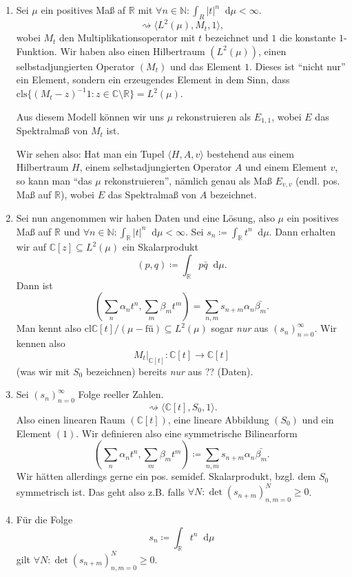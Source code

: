 \documentclass[letterpaper, 11pt]{article}
\newcommand{\R}{\mathbb{R}}
\newcommand{\C}{\mathbb{C}}
\newcommand{\N}{\mathbb{N}}
\newcommand{\1}{\mathds{1}}
\newcommand{\dd}{\mathop{}\!\mathrm{d}}
\theoremstyle{definition}
\begin{document}
\begin{enumerate}
  \item Sei $\mu$ ein positives Maß af $\R$ mit $\forall n \in \N : \int_R \vert t \vert^n \dd \mu < \infty$.
  $$ \rightsquigarrow \langle L^2(\mu), M_t, 1 \rangle, $$
  wobei $M_t$ den Multiplikationsoperator mit $t$ bezeichnet und $1$ die konstante $1$-Funktion. Wir haben also einen Hilbertraum $(L^2(\mu))$, einen selbstadjungierten Operator $(M_t)$ und das Element $1$. Dieses ist ``nicht nur'' ein Element, sondern ein erzeugendes Element in dem Sinn, dass $\mathrm{cls} \{ (M_t - z)^{-1}1 : z \in \C \setminus \R \} = L^2(\mu)$.

  Aus diesem Modell können wir uns $\mu$ rekonstruieren als $E_{1,1}$, wobei $E$ das Spektralmaß von $M_t$ ist.

  Wir sehen also: Hat man ein Tupel $\langle H, A, v \rangle$ bestehend aus einem Hilbertraum $H$, einem selbstadjungierten Operator $A$ und einem Element $v$, so kann man ``das $\mu$ rekonstruieren'', nämlich genau als Maß $E_{v,v}$ (endl. pos. Maß auf $\R$), wobei $E$ das Spektralmaß von $A$ bezeichnet.

  \item Sei nun angenommen wir haben Daten und eine Lösung, also $\mu$ ein positives Maß auf $\R$ und $\forall n \in \N : \int_\R \vert t \vert^n \dd \mu < \infty$. Sei $s_n \coloneqq \int_\R t^n \dd \mu$. Dann erhalten wir auf $\C[z] \subseteq L^2(\mu)$ ein Skalarprodukt
  $$ (p, q) \coloneqq \int_\R p \bar{q} \dd \mu. $$
  Dann ist
  $$ (\sum_n \alpha_n t^n, \sum_m \beta_m t^m) = \sum_{n,m} s_{n+m} \alpha_n \bar{\beta_m}. $$
  Man kennt also $\mathrm{cl} \C[t] / (\mu-\textrm{fü}) \subseteq L^2(\mu)$ sogar \emph{nur} aus $(s_n)_{n=0}^\infty$. Wir kennen also
  $$ M_t \vert_{\C[t]} : \C[t] \to \C[t] $$
  (was wir mit $S_0$ bezeichnen) bereits \emph{nur} aus ?? (Daten).

  \item Sei $(s_n)_{n=0}^\infty$ Folge reeller Zahlen.
  $$ \rightsquigarrow \langle \C[t], S_0, 1 \rangle. $$
  Also einen linearen Raum $(\C[t])$, eine lineare Abbildung $(S_0)$ und ein Element $(1)$. Wir definieren also eine symmetrische Bilinearform
  $$ (\sum_n \alpha_n t^n, \sum_m \beta_m t^m) \coloneqq \sum_{n,m} s_{n+m} \alpha_n \bar{\beta_m}. $$
  Wir hätten allerdings gerne ein pos. semidef. Skalarprodukt, bzgl. dem $S_0$ symmetrisch ist. Das geht also z.B. falls $\forall N : \det (s_{n+m})_{n,m=0}^N \geq 0$.

  \item Für die Folge
  $$ s_n \coloneqq \int_\R t^n \dd \mu $$
  gilt $\forall N : \det (s_{n+m})_{n,m=0}^N \geq 0$.


\end{enumerate}
\end{document}

